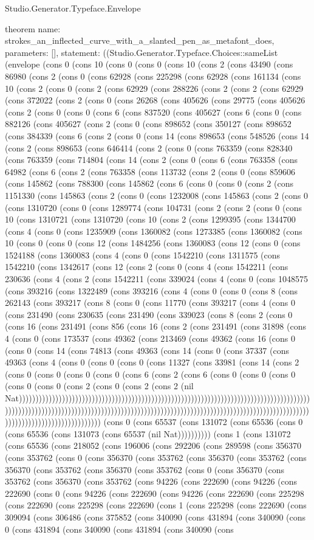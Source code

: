 \begin{lexlean}{Studio.Generator.Typeface.Envelope}
\begin{semanticmodule}
theorem{
  name: strokes_an_inflected_curve_with_a_slanted_pen_as_metafont_does,
  parameters: [],
  statement: ((Studio.Generator.Typeface.Choices::sameList (envelope (cons 0 (cons 10 (cons 0 (cons 0 (cons 10 (cons 2 (cons 43490 (cons 86980 (cons 2 (cons 0 (cons 62928 (cons 225298 (cons 62928 (cons 161134 (cons 10 (cons 2 (cons 0 (cons 2 (cons 62929 (cons 288226 (cons 2 (cons 2 (cons 62929 (cons 372022 (cons 2 (cons 0 (cons 26268 (cons 405626 (cons 29775 (cons 405626 (cons 2 (cons 0 (cons 0 (cons 6 (cons 837520 (cons 405627 (cons 6 (cons 0 (cons 882126 (cons 405627 (cons 2 (cons 0 (cons 898652 (cons 350127 (cons 898652 (cons 384339 (cons 6 (cons 2 (cons 0 (cons 14 (cons 898653 (cons 548526 (cons 14 (cons 2 (cons 898653 (cons 646414 (cons 2 (cons 0 (cons 763359 (cons 828340 (cons 763359 (cons 714804 (cons 14 (cons 2 (cons 0 (cons 6 (cons 763358 (cons 64982 (cons 6 (cons 2 (cons 763358 (cons 113732 (cons 2 (cons 0 (cons 859606 (cons 145862 (cons 788300 (cons 145862 (cons 6 (cons 0 (cons 0 (cons 2 (cons 1151330 (cons 145863 (cons 2 (cons 0 (cons 1232008 (cons 145863 (cons 2 (cons 0 (cons 1310720 (cons 0 (cons 1289774 (cons 104731 (cons 2 (cons 2 (cons 0 (cons 10 (cons 1310721 (cons 1310720 (cons 10 (cons 2 (cons 1299395 (cons 1344700 (cons 4 (cons 0 (cons 1235909 (cons 1360082 (cons 1273385 (cons 1360082 (cons 10 (cons 0 (cons 0 (cons 12 (cons 1484256 (cons 1360083 (cons 12 (cons 0 (cons 1524188 (cons 1360083 (cons 4 (cons 0 (cons 1542210 (cons 1311575 (cons 1542210 (cons 1342617 (cons 12 (cons 2 (cons 0 (cons 4 (cons 1542211 (cons 230636 (cons 4 (cons 2 (cons 1542211 (cons 339024 (cons 4 (cons 0 (cons 1048575 (cons 393216 (cons 1322489 (cons 393216 (cons 4 (cons 0 (cons 0 (cons 8 (cons 262143 (cons 393217 (cons 8 (cons 0 (cons 11770 (cons 393217 (cons 4 (cons 0 (cons 231490 (cons 230635 (cons 231490 (cons 339023 (cons 8 (cons 2 (cons 0 (cons 16 (cons 231491 (cons 856 (cons 16 (cons 2 (cons 231491 (cons 31898 (cons 4 (cons 0 (cons 173537 (cons 49362 (cons 213469 (cons 49362 (cons 16 (cons 0 (cons 0 (cons 14 (cons 74813 (cons 49363 (cons 14 (cons 0 (cons 37337 (cons 49363 (cons 4 (cons 0 (cons 0 (cons 0 (cons 11327 (cons 33981 (cons 14 (cons 2 (cons 0 (cons 0 (cons 0 (cons 0 (cons 6 (cons 2 (cons 6 (cons 0 (cons 0 (cons 0 (cons 0 (cons 0 (cons 2 (cons 0 (cons 2 (cons 2 (nil Nat))))))))))))))))))))))))))))))))))))))))))))))))))))))))))))))))))))))))))))))))))))))))))))))))))))))))))))))))))))))))))))))))))))))))))))))))))))))))))))))))))))))))))))))))))))))))))))))))))))))))))))))))) (cons 0 (cons 65537 (cons 131072 (cons 65536 (cons 0 (cons 65536 (cons 131073 (cons 65537 (nil Nat)))))))))) (cons 1 (cons 131072 (cons 65536 (cons 218052 (cons 196006 (cons 292206 (cons 289598 (cons 356370 (cons 353762 (cons 0 (cons 356370 (cons 353762 (cons 356370 (cons 353762 (cons 356370 (cons 353762 (cons 356370 (cons 353762 (cons 0 (cons 356370 (cons 353762 (cons 356370 (cons 353762 (cons 94226 (cons 222690 (cons 94226 (cons 222690 (cons 0 (cons 94226 (cons 222690 (cons 94226 (cons 222690 (cons 225298 (cons 222690 (cons 225298 (cons 222690 (cons 1 (cons 225298 (cons 222690 (cons 309094 (cons 306486 (cons 375852 (cons 340090 (cons 431894 (cons 340090 (cons 0 (cons 431894 (cons 340090 (cons 431894 (cons 340090 (cons }
\end{semanticmodule}
\end{lexlean}
